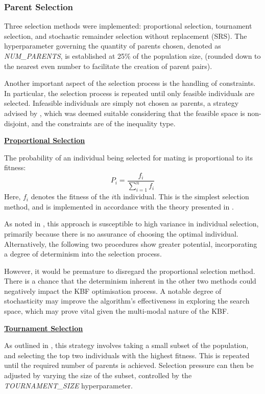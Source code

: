 \documentclass[10pt]{article}
\begin{document}
\begin{multicols}{2}
\subsubsection{Parent Selection}

Three selection methods were implemented: proportional selection, tournament selection, and stochastic remainder selection without replacement (SRS). The hyperparameter governing the quantity of parents chosen, denoted as \textit{NUM\_PARENTS}, is established at 25\% of the population size, (rounded down to the nearest even number to facilitate the creation of parent pairs).

Another important aspect of the selection process is the handling of constraints. In particular, the selection process is repeated until only feasible individuals are selected. Infeasible individuals are simply not chosen as parents, a strategy advised by \cite{parks2023geneticalgorithms}, which was deemed suitable considering that the feasible space is non-disjoint, and the constraints are of the inequality type.

\textbf{\underline{Proportional Selection}}

The probability of an individual being selected for mating is proportional to its fitness:
\[
    P_i = \frac{f_i}{\sum_{i=1}^{n} f_i}
\]
Here, \(f_i\) denotes the fitness of the \(i\)th individual. This is the simplest selection method, and is implemented in accordance with the theory presented in \cite{parks2023geneticalgorithms}.

As noted in \cite{parks2023geneticalgorithms}, this approach is susceptible to high variance in individual selection, primarily because there is no assurance of choosing the optimal individual. Alternatively, the following two procedures show greater potential, incorporating a degree of determinism into the selection process.

However, it would be premature to disregard the proportional selection method. There is a chance that the determinism inherent in the other two methods could negatively impact the KBF optimisation process. A notable degree of stochasticity may improve the algorithm's effectiveness in exploring the search space, which may prove vital given the multi-modal nature of the KBF.

\textbf{\underline{Tournament Selection}}

As outlined in \cite{parks2023geneticalgorithms}, this strategy involves taking a small subset of the population, and selecting the top two individuals with the highest fitness. This is repeated until the required number of parents is achieved. Selection pressure can then be adjusted by varying the size of the subset, controlled by the \textit{TOURNAMENT\_SIZE} hyperparameter.


\end{multicols}
\end{document}
